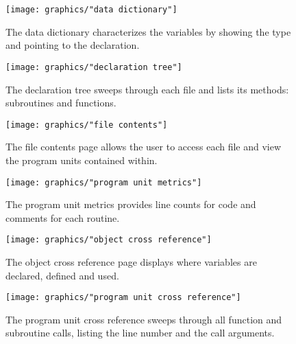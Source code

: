 \documentclass[11pt, oneside]{article}   	%
\begin{document}
\begin{figure}[htbp] %
   \centering
   \texttt{[image: graphics/"data dictionary"]} 
   \caption{The data dictionary characterizes the variables by showing the type and pointing to the declaration.}
   \label{fig:data dictionary}
\end{figure}

\begin{figure}[htbp] %
   \centering
   \texttt{[image: graphics/"declaration tree"]} 
   \caption{The declaration tree sweeps through each file and lists its methods: subroutines and functions.}
   \label{fig:declaration tree}
\end{figure}

\begin{figure}[htbp] %
   \centering
   \texttt{[image: graphics/"file contents"]} 
   \caption{The file contents page allows the user to access each file and view the program units contained within.}
   \label{fig:file contents}
\end{figure}

\begin{figure}[htbp] %
   \centering
   \texttt{[image: graphics/"program unit metrics"]} 
   \caption{The program unit metrics provides line counts for code and comments for each routine.}
   \label{fig:program unit metrics}
\end{figure}

\begin{figure}[htbp] %
   \centering
   \texttt{[image: graphics/"object cross reference"]} 
   \caption{The object cross reference page displays where variables are declared, defined and used.}
   \label{fig:object cross reference}
\end{figure}

\begin{figure}[htbp] %
   \centering
   \texttt{[image: graphics/"program unit cross reference"]} 
   \caption{The program unit cross reference sweeps through all function and subroutine calls, listing the line number and the call arguments.}
   \label{fig:program unit cross reference}
\end{figure}
\end{document}
